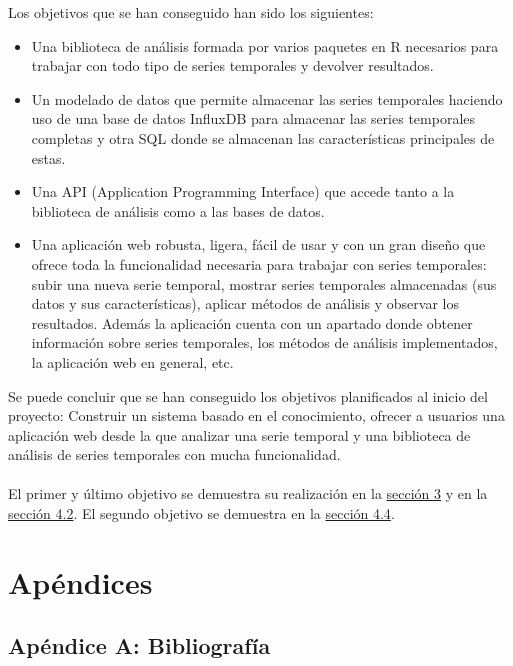 \documentclass[14pt]{extarticle}
\theoremstyle{definition}
\theoremstyle{remark}
\begin{document}
Los objetivos que se han conseguido han sido los siguientes:
\begin{itemize}
	\item Una biblioteca de análisis formada por varios paquetes en R necesarios para trabajar con todo tipo de series temporales y devolver resultados.
	\item Un modelado de datos que permite almacenar las series temporales haciendo uso de una base de datos InfluxDB para almacenar las series temporales completas y otra SQL donde se almacenan las características principales de estas.
	\item Una API (Application Programming Interface) que accede tanto a la biblioteca de análisis como a las bases de datos.
	\item Una aplicación web robusta, ligera, fácil de usar y con un gran diseño que ofrece toda la funcionalidad necesaria para trabajar con series temporales: subir una nueva serie temporal, mostrar series temporales almacenadas (sus datos y sus características), aplicar métodos de análisis y observar los resultados. Además la aplicación cuenta con un apartado donde obtener información sobre series temporales, los métodos de análisis implementados, la aplicación web en general, etc.
\end{itemize}
Se puede concluir que se han conseguido los objetivos planificados al inicio del proyecto: Construir un sistema basado en el conocimiento, ofrecer a usuarios una aplicación web desde la que analizar una serie temporal y una biblioteca de análisis de series temporales con mucha funcionalidad.\\\\El primer y último objetivo se demuestra su realización en la \hyperref[sec:bibliotecadeanalisis]{sección 3} y en la \hyperref[sec:bibliotecar]{sección 4.2}. El segundo objetivo se demuestra en la \hyperref[sec:angularaplicacionweb]{sección 4.4}.
\newpage
\section{Apéndices}\label{sec:apendices}
\subsection{Apéndice A: Bibliografía}\label{sec:bibliografia}


\newpage
\end{document}
